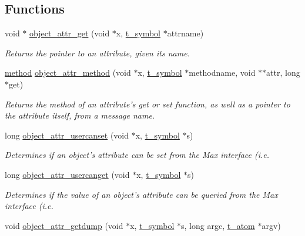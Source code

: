 \subsection*{Functions}
\begin{DoxyCompactItemize}
\item 
void $\ast$ \hyperlink{group__attr_ga26e3d2d547a494e2dbb994cff446a1d2}{object\_\-attr\_\-get} (void $\ast$x, \hyperlink{structt__symbol}{t\_\-symbol} $\ast$attrname)
\begin{DoxyCompactList}\small\item\em Returns the pointer to an attribute, given its name. \item\end{DoxyCompactList}\item 
\hyperlink{group__datatypes_gac26ba0a173b50597f5738132e059b42d}{method} \hyperlink{group__attr_ga6f3c64b07f0bef74e968f41925d2a595}{object\_\-attr\_\-method} (void $\ast$x, \hyperlink{structt__symbol}{t\_\-symbol} $\ast$methodname, void $\ast$$\ast$attr, long $\ast$get)
\begin{DoxyCompactList}\small\item\em Returns the method of an attribute's {\ttfamily get} or {\ttfamily set} function, as well as a pointer to the attribute itself, from a message name. \item\end{DoxyCompactList}\item 
long \hyperlink{group__attr_gac37ffb3ff9cfe4840c351ce2387c5f9e}{object\_\-attr\_\-usercanset} (void $\ast$x, \hyperlink{structt__symbol}{t\_\-symbol} $\ast$s)
\begin{DoxyCompactList}\small\item\em Determines if an object's attribute can be set from the Max interface (i.e. \item\end{DoxyCompactList}\item 
long \hyperlink{group__attr_ga92423948e8671cf9796a247f9caef706}{object\_\-attr\_\-usercanget} (void $\ast$x, \hyperlink{structt__symbol}{t\_\-symbol} $\ast$s)
\begin{DoxyCompactList}\small\item\em Determines if the value of an object's attribute can be queried from the Max interface (i.e. \item\end{DoxyCompactList}\item 
void \hyperlink{group__attr_gadf2a0e143dd9a5426516af02283f2c97}{object\_\-attr\_\-getdump} (void $\ast$x, \hyperlink{structt__symbol}{t\_\-symbol} $\ast$s, long argc, \hyperlink{structt__atom}{t\_\-atom} $\ast$argv)
$$
\end{DoxyCompactItemize}
